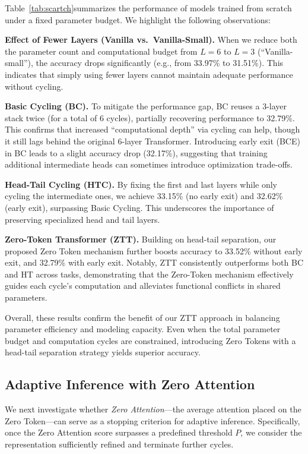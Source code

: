 Table~\ref{tab:scartch}summarizes the performance of models trained {from scratch} under a fixed parameter budget. We highlight the following observations:

\textbf{Effect of Fewer Layers (Vanilla vs.\ Vanilla-Small).}
When we reduce both the parameter count and computational budget from $L=6$ to $L=3$ (``Vanilla-small''), the accuracy drops significantly (e.g., from 33.97\% to 31.51\%). {This indicates that simply using fewer layers cannot maintain adequate performance without cycling.}

\textbf{Basic Cycling (BC).}
To mitigate the performance gap, {BC} reuses a 3-layer stack twice (for a total of 6 cycles), partially recovering performance to 32.79\%. This confirms that increased ``computational depth'' via cycling can help, though it still lags behind the original 6-layer Transformer. Introducing {early exit} ({BCE}) in BC leads to a slight accuracy drop (32.17\%), suggesting that training additional intermediate heads can sometimes introduce optimization trade-offs.

\textbf{Head-Tail Cycling (HTC).}
By fixing the first and last layers while only cycling the intermediate ones, {we achieve 33.15\% (no early exit) and 32.62\% (early exit), surpassing Basic Cycling.} This underscores the importance of preserving specialized head and tail layers.

\textbf{Zero-Token Transformer (ZTT).}
Building on head-tail separation, our proposed {Zero Token} mechanism further boosts accuracy to 33.52\% without early exit, and 32.79\% with early exit. Notably, ZTT consistently outperforms both BC and HT across tasks, demonstrating that the Zero-Token mechanism effectively guides each cycle’s computation and alleviates functional conflicts in shared parameters.

Overall, these results confirm the benefit of our {ZTT} approach in balancing parameter efficiency and modeling capacity. Even when the total parameter budget and computation cycles are constrained, introducing Zero Tokens with a head-tail separation strategy yields superior accuracy.

\subsection{Adaptive Inference with Zero Attention}
\label{sec:adaptive_inference}



We next investigate whether \textit{Zero Attention}—the average attention placed on the Zero Token—can serve as a stopping criterion for adaptive inference. Specifically, once the Zero Attention score surpasses a predefined threshold \( P \), we consider the representation sufficiently refined and terminate further cycles.

